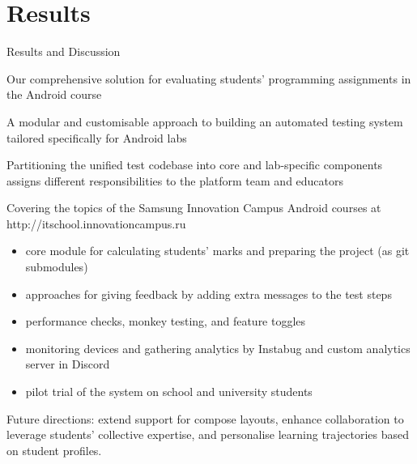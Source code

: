 \documentclass{beamer}%
\begin{document}
\section[Results]{Results}
\begin{frame}{Results and Discussion}
\begin{changemargin}
\footnotesize


Our comprehensive solution for evaluating students' programming assignments in the Android course

A modular and customisable approach to building an automated testing system tailored specifically for Android labs

Partitioning the unified test codebase into core and lab-specific components assigns different responsibilities to the platform team and educators


Covering the topics of the Samsung Innovation Campus Android courses at http://itschool.innovationcampus.ru \vspace{1.2ex}

\begin{itemize}
\item<1-> core module for calculating students' marks and preparing the project (as git submodules)
\item<1-> approaches for giving feedback by adding extra messages to the test steps
\item<1-> performance checks, monkey testing, and feature toggles
\item<1-> monitoring devices and gathering analytics by Instabug and custom analytics server in Discord
\item<1-> pilot trial of the system on school and university students
\end{itemize}

Future directions: extend support for compose layouts, enhance collaboration to leverage students' collective expertise, and personalise learning trajectories based on student profiles.






\end{changemargin}
\end{frame}
\end{document}
